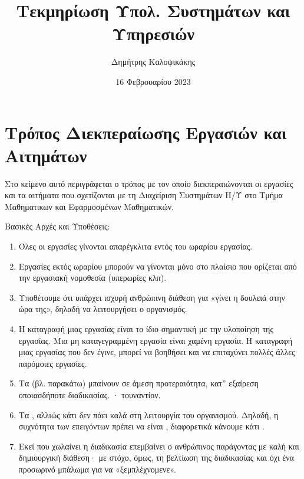 \documentclass[letterpaper,10pt,greek]{sphinxhowto}
\title{Τεκμηρίωση Υπολ. Συστημάτων και Υπηρεσιών}
\date{16 Φεβρουαρίου 2023}
\author{Δημήτρης Καλοψικάκης}
\begin{document}
\pagestyle{empty}
\sphinxmaketitle
\pagestyle{plain}
\sphinxtableofcontents
\pagestyle{normal}
\label{\detokenize{index::doc}}


\sphinxstepscope


\section{Τρόπος Διεκπεραίωσης Εργασιών και Αιτημάτων}
\label{\detokenize{PolicyTicket:id1}}\label{\detokenize{PolicyTicket::doc}}
\sphinxAtStartPar
Στο κείμενο αυτό περιγράφεται ο τρόπος με τον οποίο
διεκπεραιώνονται οι εργασίες και τα αιτήματα που σχετίζονται
με τη Διαχείριση Συστημάτων Η/Υ στο Τμήμα Μαθηματικων και Εφαρμοσμένων Μαθηματικών.

\sphinxAtStartPar
Βασικές Αρχές και Υποθέσεις:
\begin{enumerate}
%
\item {} 
\sphinxAtStartPar
Όλες οι εργασίες γίνονται απαρέγκλιτα εντός του ωραρίου εργασίας.

\item {} 
\sphinxAtStartPar
Εργασίες εκτός ωραρίου μπορούν να γίνονται μόνο στο πλαίσιο που ορίζεται από την εργασιακή νομοθεσία (υπερωρίες κλπ).

\item {} 
\sphinxAtStartPar
Υποθέτουμε ότι υπάρχει ισχυρή ανθρώπινη διάθεση για «γίνει η δουλειά στην ώρα της», δηλαδή να λειτουργήσει ο οργανισμός.

\item {} 
\sphinxAtStartPar
Η καταγραφή μιας εργασίας είναι  το ίδιο σημαντική με την υλοποίηση της εργασίας. Μια μη καταγεγραμμένη εργασία είναι χαμένη εργασία. Η καταγραφή μιας εργασίας που δεν έγινε, μπορεί να βοηθήσει και να επιταχύνει πολλές άλλες παρόμοιες εργασίες.

\item {} 
\sphinxAtStartPar
Τα  (βλ. παρακάτω) μπαίνουν σε άμεση προτεραιότητα, κατ” εξαίρεση οποιασδήποτε διαδικασίας. · τουναντίον.

\item {} 
\sphinxAtStartPar
Τα , αλλιώς κάτι δεν πάει καλά στη λειτουργία του οργανισμού. Δηλαδή, η συχνότητα των επειγόντων πρέπει να είναι , διαφορετικά κάνουμε κάτι .

\item {} 
\sphinxAtStartPar
Εκεί που χωλαίνει η διαδικασία επεμβαίνει ο ανθρώπινος παράγοντας με καλή και δημιουργική διάθεση· με στόχο, όμως, τη βελτίωση της διαδικασίας και όχι ένα προσωρινό μπάλωμα για να «ξεμπλέχνομενε».

\end{enumerate}
\end{document}
